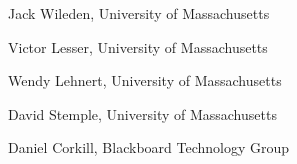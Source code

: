 \begin{Graduate and Postdoctoral Advisors}
\item Jack Wileden, University of Massachusetts
\item Victor Lesser, University of Massachusetts
\item Wendy Lehnert, University of Massachusetts
\item David Stemple, University of Massachusetts
\item Daniel Corkill, Blackboard Technology Group
\end{Graduate and Postdoctoral Advisors}












